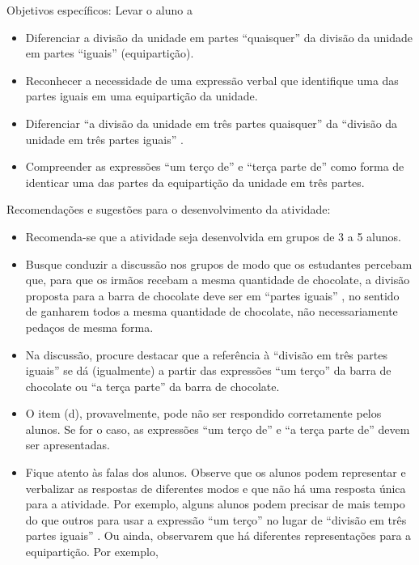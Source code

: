 \documentclass[a4paper,12pt,twoside]{book}
\begin{document}
\begin{professor*}[breakable]{}{}   Objetivos específicos: Levar o aluno a   
\begin{itemize} %
    \item       Diferenciar a divisão da unidade em partes       ``quaisquer''       da divisão da unidade em partes       ``iguais''       (equipartição). 
    \item       Reconhecer a necessidade de uma expressão verbal que identifique uma das partes iguais em uma equipartição da unidade.
    \item       Diferenciar       ``a divisão da unidade em três partes quaisquer''       da       ``divisão da unidade em três partes iguais''      . 
    \item       Compreender as expressões       ``um terço de''       e       ``terça parte de''       como forma de identicar uma das partes da equipartição da unidade em três partes. 
\end{itemize} %
  
  
  
  
  Recomendações e sugestões para o desenvolvimento da atividade:  
\begin{itemize} %
    \item       Recomenda-se que a atividade seja desenvolvida em grupos de 3 a 5 alunos. 
    \item       Busque conduzir a discussão nos grupos de modo que os estudantes percebam que, para que os irmãos recebam a mesma quantidade de chocolate, a divisão proposta para a barra de chocolate deve ser em       ``partes iguais''      , no sentido de ganharem todos a mesma quantidade de chocolate, não necessariamente pedaços de mesma forma.
    \item       Na discussão, procure destacar que a referência à       ``divisão em três partes iguais''       se dá (igualmente) a partir das expressões       ``um terço''       da barra de chocolate ou       ``a terça parte''       da barra de chocolate.
    \item       O item (d), provavelmente, pode não ser respondido corretamente pelos alunos. Se for o caso, as expressões       ``um terço de''       e       ``a terça parte de''       devem ser apresentadas. 
    \item       Fique atento às falas dos alunos. Observe que os alunos podem representar e verbalizar as respostas de diferentes modos e que não há uma resposta única para a atividade. Por exemplo, alguns alunos podem precisar de mais tempo do que outros para usar a expressão       ``um terço''       no lugar de       ``divisão em três partes iguais''      . Ou ainda, observarem que há diferentes representações para a equipartição. Por exemplo, 
\end{itemize} %
  

\end{professor*}
\end{document}
